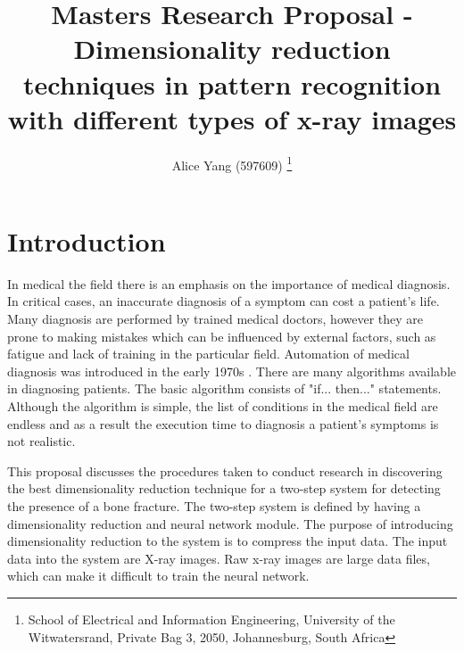 \documentclass[11pt,twocolumn]{witseiepaper}
\begin{document}
	\title{Masters Research Proposal - Dimensionality reduction techniques in pattern recognition with different types of x-ray images }
	
	\author{Alice Yang (597609) \thanks{School of Electrical and Information Engineering, University of the Witwatersrand, Private Bag 3, 2050, Johannesburg, South Africa} }
	
	
	\maketitle
	\thispagestyle{empty}\pagestyle{empty}
	
	\section{Introduction}
	In medical the field there is an emphasis on the importance of medical diagnosis. In critical cases, an inaccurate diagnosis of a symptom can cost a patient's life. Many diagnosis are performed by trained medical doctors, however they are prone to making mistakes which can be influenced by external factors, such as fatigue and lack of training in the particular field. Automation of medical diagnosis was introduced in the early 1970s \cite{Ramesh2004}. There are many algorithms available in diagnosing patients. The basic algorithm consists of "if... then..." statements. Although the algorithm is simple, the list of conditions in the medical field are endless and as a result the execution time to diagnosis a patient's symptoms is not realistic. 
	
	This proposal discusses the procedures taken to conduct research in discovering the best dimensionality reduction technique for a two-step system for detecting the presence of a bone fracture. The two-step system is defined by having a dimensionality reduction and neural network module. The purpose of introducing dimensionality reduction to the system is to compress the input data. The input data into the system are X-ray images. Raw x-ray images are large data files, which can make it difficult to train the neural network.
	
\end{document}
